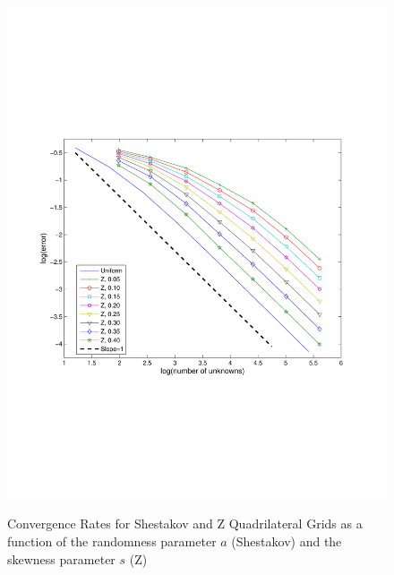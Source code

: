 \documentclass[preprint,10pt]{elsarticle}
\begin{document}
\begin{figure}[!hbtp]
{\includegraphics[scale=0.28]{../pwld_diffusion/results/convergence/cv_Z_quad}
\label{fig:cv_rate_Z_quad}
}
\caption{Convergence Rates for Shestakov and Z Quadrilateral Grids as a function of the randomness parameter $a$ (Shestakov) and the skewness parameter $s$ (Z)}
\label{fig:conv_rate_shes_Z_quad}
\end{figure}

\end{document}
